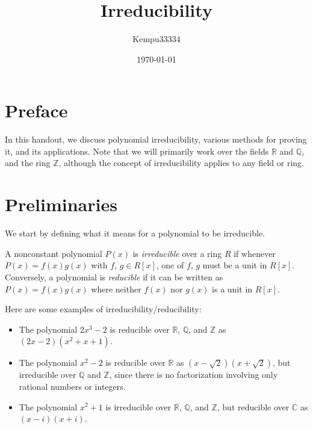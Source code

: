 \documentclass[11pt]{scrartcl}
\title{Irreducibility}
\author{\LARGE Kempu33334}
\date{\large \today}
\begin{document}
\maketitle

\tableofcontents

\newpage

\section{Preface}

In this handout, we discuss polynomial irreducibility, various methods for proving it, and its applications. Note that we will primarily work over the fields $\mathbb{R}$ and $\mathbb{Q}$, and the ring $\mathbb{Z}$, although the concept of irreducibility applies to any field or ring.

\section{Preliminaries}

We start by defining what it means for a polynomial to be irreducible.

\begin{definition*}[Irreducibility]
A nonconstant polynomial $P(x)$ is \emph{irreducible} over a ring $R$ if whenever $P(x)=f(x)g(x)$ with $f$, $g\in R[x]$, one of $f$, $g$ must be a unit in $R[x]$. Conversely, a polynomial is \emph{reducible} if it can be written as $P(x)=f(x)g(x)$ where neither $f(x)$ nor $g(x)$ is a unit in $R[x]$.
\end{definition*}

Here are some examples of irreducibility/reducibility:

\begin{example*}
\begin{itemize}
\item The polynomial $2x^3-2$ is reducible over $\mathbb{R}$, $\mathbb{Q}$, and $\mathbb{Z}$ as $(2x-2)(x^2+x+1)$.
\item The polynomial $x^2-2$ is reducible over $\mathbb{R}$ as $(x-\sqrt{2})(x+\sqrt{2})$, but irreducible over $\mathbb{Q}$ and $\mathbb{Z}$, since there is no factorization involving only rational numbers or integers.
\item The polynomial $x^2+1$ is irreducible over $\mathbb{R}$, $\mathbb{Q}$, and $\mathbb{Z}$, but reducible over $\mathbb{C}$ as $(x-i)(x+i)$.
\end{itemize}
\end{example*}
\end{document}
